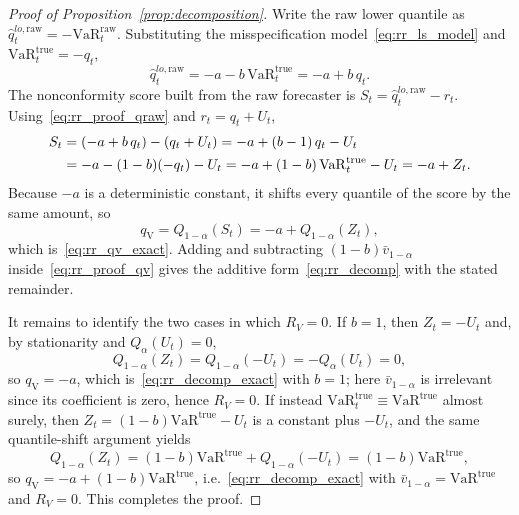 \documentclass[11pt]{article}
\newcommand{\VaR}{\mathrm{VaR}}
\newcommand{\1}{\boldsymbol{1}}
\newcommand{\qV}{q_{\scriptscriptstyle\mathrm{V}}}          %
\begin{document}
\begin{proof}[Proof of Proposition~\ref{prop:decomposition}]
Write the raw lower quantile as
$\hat q_t^{lo,\mathrm{raw}}=-\VaR_t^{\mathrm{raw}}$. Substituting the
misspecification model~\eqref{eq:rr_ls_model} and
$\VaR_t^{\mathrm{true}}=-q_t$,
\begin{equation}
\label{eq:rr_proof_qraw}
\hat q_t^{lo,\mathrm{raw}}
= -a - b\,\VaR_t^{\mathrm{true}}
= -a + b\,q_t .
\end{equation}
The nonconformity score built from the raw forecaster is
$S_t=\hat q_t^{lo,\mathrm{raw}}-r_t$. Using~\eqref{eq:rr_proof_qraw} and
$r_t=q_t+U_t$,
\begin{align}
S_t
&= (-a + b\,q_t) - (q_t + U_t)
= -a + (b-1)\,q_t - U_t \notag\\
&= -a - (1-b)(-q_t) - U_t
= -a + (1-b)\,\VaR_t^{\mathrm{true}} - U_t
= -a + Z_t .
\label{eq:rr_proof_score}
\end{align}
Because $-a$ is a deterministic constant, it shifts every quantile of the
score by the same amount, so
\begin{equation}
\label{eq:rr_proof_qv}
\qV = Q_{1-\alpha}(S_t) = -a + Q_{1-\alpha}(Z_t),
\end{equation}
which is~\eqref{eq:rr_qv_exact}. Adding and subtracting
$(1-b)\bar v_{1-\alpha}$ inside~\eqref{eq:rr_proof_qv} gives the additive
form~\eqref{eq:rr_decomp} with the stated remainder.

It remains to identify the two cases in which $R_V=0$. If $b=1$, then
$Z_t=-U_t$ and, by stationarity and $Q_\alpha(U_t)=0$,
\begin{equation}
\label{eq:rr_proof_bias}
Q_{1-\alpha}(Z_t)=Q_{1-\alpha}(-U_t)=-Q_{\alpha}(U_t)=0,
\end{equation}
so $\qV=-a$, which is~\eqref{eq:rr_decomp_exact} with $b=1$; here
$\bar v_{1-\alpha}$ is irrelevant since its coefficient is zero, hence $R_V=0$.
If instead $\VaR_t^{\mathrm{true}}\equiv \VaR^{\mathrm{true}}$ almost surely,
then $Z_t=(1-b)\VaR^{\mathrm{true}}-U_t$ is a constant plus $-U_t$, and the same
quantile-shift argument yields
\begin{equation}
\label{eq:rr_proof_scale}
Q_{1-\alpha}(Z_t)=(1-b)\VaR^{\mathrm{true}}+Q_{1-\alpha}(-U_t)
=(1-b)\VaR^{\mathrm{true}},
\end{equation}
so $\qV=-a+(1-b)\VaR^{\mathrm{true}}$, i.e.~\eqref{eq:rr_decomp_exact} with
$\bar v_{1-\alpha}=\VaR^{\mathrm{true}}$ and $R_V=0$. This completes the proof.
\end{proof}
\end{document}
